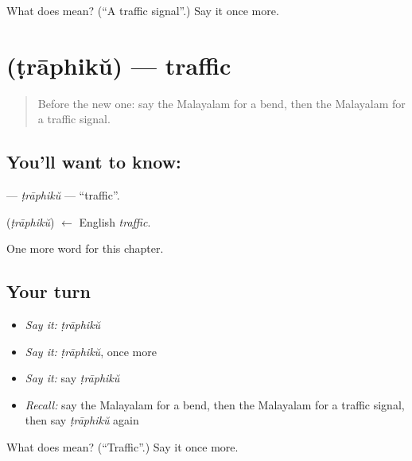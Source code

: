 \begin{tcolorbox}[breakable,colback=teal!4,colframe=teal!35!black,title={Before you move on}]
What does  mean? (\textquotedblleft{}A traffic signal\textquotedblright{}.) Say it once more.
\end{tcolorbox}
\section[\texorpdfstring{\ml{ട്രാഫിക്} (ṭrāphikŭ)}{ട്രാഫിക് (ṭrāphikŭ)}]{ (ṭrāphikŭ) — traffic}

\label{lesson:ML-C278-traphiku}



\begin{quote}
Before the new one: say the Malayalam for a bend, then the Malayalam for a traffic signal.
\end{quote}

\subsection*{You'll want to know: }
\textbf{} — \emph{ṭrāphikŭ} — \textquotedblleft{}traffic\textquotedblright{}.

\begin{cousinweb}
\textbf{} (\emph{ṭrāphikŭ}) $\leftarrow$ English \emph{traffic}.
\end{cousinweb}

\begin{grammarlens}[title={What you've built}]
One more word for this chapter.
\end{grammarlens}

\subsection*{Your turn}
\begin{itemize}
\raggedright
  \item \emph{Say it:} \emph{ṭrāphikŭ}
  \item \emph{Say it:} \emph{ṭrāphikŭ}, once more
  \item \emph{Say it:} say \emph{ṭrāphikŭ}
  \item \emph{Recall:} say the Malayalam for a bend, then the Malayalam for a traffic signal, then say \emph{ṭrāphikŭ} again
\end{itemize}

\begin{tcolorbox}[breakable,colback=teal!4,colframe=teal!35!black,title={Before you move on}]
What does  mean? (\textquotedblleft{}Traffic\textquotedblright{}.) Say it once more.
\end{tcolorbox}
